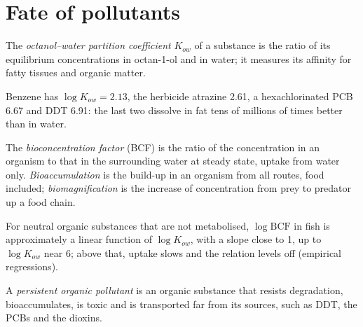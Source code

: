 \section{Fate of pollutants}

\begin{definition}\label{def:b3:environmental-toxicology:kow}
The \emph{octanol--water partition coefficient} $K_{ow}$ of a substance is the ratio of its equilibrium concentrations in
octan-1-ol and in water; it measures its affinity for fatty tissues and organic
matter.
\end{definition}

Benzene has $\log K_{ow} = 2.13$, the herbicide atrazine 2.61, a hexachlorinated PCB 6.67 and
DDT 6.91: the last two dissolve in fat tens of millions of times better than in
water.

\begin{definition}[Bioaccumulation]\label{def:b3:environmental-toxicology:bio}
The \emph{bioconcentration factor} (BCF) is the
ratio of the concentration in an organism to that in the surrounding water at
steady state, uptake from water only. \emph{Bioaccumulation}
is the build-up in an organism from all routes, food included;
\emph{biomagnification} is the increase of
concentration from prey to predator up a food chain.
\end{definition}

\begin{proposition}\label{prop:b3:environmental-toxicology:bcf-kow}
For neutral organic substances that are not metabolised, $\log\mathrm{BCF}$ in fish is
approximately a linear function of $\log K_{ow}$, with a slope close to 1, up to $\log K_{ow}$ near 6;
above that, uptake slows and the relation levels off (empirical regressions).
\admitted
\end{proposition}

\begin{definition}\label{def:b3:environmental-toxicology:pop}
A \emph{persistent organic pollutant} is an
organic substance that resists degradation, bioaccumulates, is toxic and is
transported far from its sources, such as DDT, the PCBs and the dioxins.
\end{definition}

